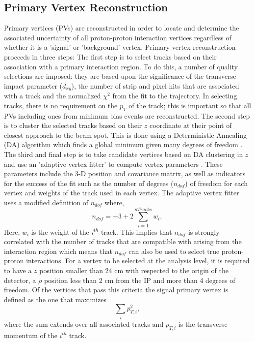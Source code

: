\subsection{Primary Vertex Reconstruction}
Primary vertices (PVs) are reconstructed in order to locate and determine the associated uncertainty of all
proton-proton interaction vertices regardless of whether it is a 'signal' or 'background' vertex.
Primary vertex reconstruction proceeds in three steps:
The first step is to select tracks based on their association with a primary interaction region.
To do this, a number of quality selections are imposed: they are based upon the significance of the
transverse impact parameter ($d_{xy}$), the number of strip and pixel hits that are 
associated with a track and the normalized $\chi^{2}$ from the fit to the
trajectory. In selecting tracks, there is no requirement on the $p_{T}$ of the track; 
this is important so that all PVs including ones from minimum bias events are reconstructed.
The second step is to cluster the selected tracks based on their $z$ coordinate at their
point of closest approach to the beam spot. This is done using a Deterministic Annealing (DA)
algorithm which finds a global minimum given many degrees of freedom \cite{DAAnnealing}.
The third and final step is to take candidate vertices based on DA clustering in $z$ and use
an 'adaptive vertex fitter'  
to compute vertex parameters \cite{KalmanFilter}. These parameters include the 3-D position and covariance matrix,
as well as indicators for the success of the fit such as the number of degrees ($n_{dof}$) of freedom for
each vertex and weights of the track used in each vertex. The adaptive vertex fitter
uses a modified definition of $n_{dof}$ where,
\begin{equation}
n_{dof} = -3+2\sum^{nTracks}_{i=1} w_{i},
\end{equation}
Here, $w_{i}$ is the weight of the $i^{th}$ track. This implies that $n_{dof}$ is strongly
correlated with the number of tracks that are compatible with arising from the interaction
region which means that $n_{dof}$ can also be used to select true proton-proton interactions.
For a vertex to be selected at the analysis level, it is required to have a $z$ position
smaller than 24 cm with respected to the origin of the detector, a $\rho$ position
less than 2 cm from the IP and more than 4 degrees of freedom. Of the vertices
that pass this criteria the signal primary vertex is defined as the one that maximizes
\begin{equation}
\sum_{i} p_{T,i}^{2},
\end{equation}
where the sum extends over all associated tracks and $p_{T,i}$ is the transverse momentum
of the $i^{th}$ track.
